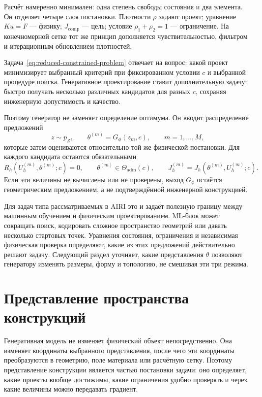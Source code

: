 Расчёт намеренно минимален: одна степень свободы состояния и два элемента. Он отделяет четыре слоя постановки. Плотности $\rho$ задают проект; уравнение $Ku=F$ --- физику; $J_{\mathrm{comp}}$ --- цель; условие $\rho_1+\rho_2=1$ --- ограничение. На конечномерной сетке тот же принцип дополняется чувствительностью, фильтром и итерационным обновлением плотностей.

Задача~\eqref{eq:reduced-constrained-problem} отвечает на вопрос: какой проект минимизирует выбранный критерий при фиксированном условии $c$ и выбранной процедуре поиска. Генеративное проектирование ставит дополнительную задачу: быстро получать несколько различных кандидатов для разных $c$, сохраняя инженерную допустимость и качество.

Поэтому генератор не заменяет определение оптимума. Он вводит распределение предложений
\begin{equation}
 z\sim p_Z,
 \qquad
 \theta^{(m)}=G_\phi(z_m,c),
 \qquad m=1,\ldots,M,
\end{equation}
которые затем оцениваются относительно той же физической постановки. Для каждого кандидата остаются обязательными
\begin{equation}
 R_h(U_h^{(m)},\theta^{(m)};c)=0,
 \qquad
 \theta^{(m)}\in\Theta_{\mathrm{adm}}(c),
 \qquad
 J_h^{(m)}=J_h(\theta^{(m)},U_h^{(m)};c).
\end{equation}
Если эти величины не вычислены или не проверены, выход $G_\phi$ остаётся геометрическим предложением, а не подтверждённой инженерной конструкцией.

Для задач типа рассматриваемых в AIRI это и задаёт полезную границу между машинным обучением и физическим проектированием. ML-блок может сокращать поиск, кодировать сложное пространство геометрий или давать несколько стартовых точек. Уравнения состояния, ограничения и независимая физическая проверка определяют, какие из этих предложений действительно решают задачу. Следующий раздел уточняет, какие представления $\theta$ позволяют генератору изменять размеры, форму и топологию, не смешивая эти три режима.

\section{Представление пространства конструкций}
\label{sec:design-space-representation}

Генеративная модель не изменяет физический объект непосредственно. Она изменяет координаты выбранного представления, после чего эти координаты преобразуются в геометрию, поле материала или расчётную сетку. Поэтому представление конструкции является частью постановки задачи: оно определяет, какие проекты вообще достижимы, какие ограничения удобно проверять и через какие величины можно передавать градиент.

